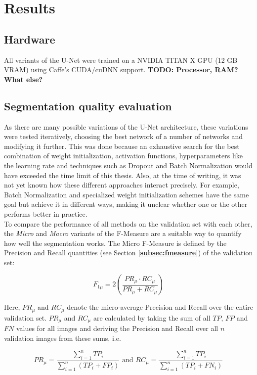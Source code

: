 \chapter {Results}
\label{chap:results}

	\section{Hardware}
All variants of the U-Net were trained on a NVIDIA TITAN X GPU (12 GB VRAM) using Caffe's CUDA/cuDNN support. \textbf{TODO: Processor, RAM? What else?}

	\section {Segmentation quality evaluation}

\noindent As there are many possible variations of the U-Net architecture, these variations were tested iteratively, choosing the best network of a number of networks and modifying it further. This was done because an exhaustive search for the best combination of weight initialization, activation functions, hyperparameters like the learning rate and techniques such as Dropout and Batch Normalization would have exceeded the time limit of this thesis. Also, at the time of writing, it was not yet known how these different approaches interact precisely. For example, Batch Normalization and specialized weight initialization schemes have the same goal but achieve it in different ways, making it unclear whether one or the other performs better in practice.\\

\noindent To compare the performance of all methods on the validation set with each other, the \textit{Micro} and \textit{Macro} variants of the F-Measure \cite{micromacro} are a suitable way to quantify how well the segmentation works. The Micro F-Measure is defined by the Precision and Recall quantities (see Section \textbf{\ref{subsec:fmeasure}}) of the validation set:

\[ F_{1\mu} = 2 \left ( \frac{PR_\mu \cdot RC_\mu}{PR_\mu + RC_\mu} \right ) \]

\noindent Here, $PR_\mu$ and $RC_\mu$ denote the micro-average Precision and Recall over the entire validation set. $PR_\mu$ and $RC_\mu$ are calculated by taking the sum of all $TP$, $FP$ and $FN$ values for all images and deriving the Precision and Recall over all $n$ validation images from these sums, i.e.

\[ PR_\mu = \frac{\sum_{i=1}^{n} TP_i}{\sum_{i=1}^{n} (TP_i + FP_i)} \text{ and }  RC_\mu = \frac{\sum_{i=1}^{n} TP_i}{\sum_{i=1}^{n} (TP_i + FN_i)} \]

